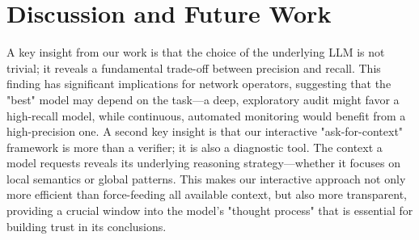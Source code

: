 




\section{Discussion and Future Work}
\label{sec:future}
A key insight from our work is that the choice of the underlying LLM is not trivial; it reveals a fundamental trade-off between precision and recall. This finding has significant implications for network operators, suggesting that the "best" model may depend on the task—a deep, exploratory audit might favor a high-recall model, while continuous, automated monitoring would benefit from a high-precision one.
A second key insight is that our interactive "ask-for-context" framework is more than a verifier; it is also a diagnostic tool. The context a model requests reveals its underlying reasoning strategy---whether it focuses on local semantics or global patterns. This makes our interactive approach not only more efficient than force-feeding all available context, but also more transparent, providing a crucial window into the model's "thought process" that is essential for building trust in its conclusions.

